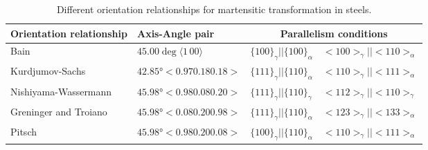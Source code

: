 
\begin{table*}
\begin{tabular}{ l l l l }
\hline\hline
    Orientation relationship & Axis-Angle pair & \multicolumn{2}{c}{Parallelism conditions} \\
    \hline
    Bain \cite{bain1924nature} &
    $45.00\deg\langle1\,00\rangle$ &
    $\{100\}_{\gamma}||\{100\}_{\alpha}$ & $<100>_{\gamma}||<110>_{\alpha}$ \\
    
    Kurdjumov-Sachs \cite{kurdjumow1930mechanismus} &
    $42.85°<0.97 0.18 0.18>$ &
    $\{111\}_{\gamma}||\{110\}_{\alpha}$ &
    $<110>_{\gamma}||<111>_{\alpha}$ \\
    
    Nishiyama-Wassermann \cite{nishiyama1934x,wassermann1935ueber} &
    $45.98° <0.98 0.08 0.20>$ &
    $\{111\}_{\gamma}||\{110\}_{\gamma}$ &
    $<112>_{\gamma}||<110>_{\gamma}$ \\
    
    Greninger and Troiano \cite{greninger1949mechanism} &
    $45.98° <0.08 0.20 0.98>$ &
    $\{111\}_{\gamma} || \{110\}_{\alpha}$ &
    $<123>_{\gamma} || <133>_{\alpha}$ \\
    
    Pitsch \cite{pitsch1962orientierungszusammenhang} &
    $45.98° <0.98 0.20 0.08>$ &
    $\{100\}_{\gamma} || \{110\}_{\alpha}$ &
    $<110>_{\gamma} || <111>_{\alpha}$ \\
\hline
\end{tabular}
\caption{\label{table_ORs}Different orientation relationships for martensitic transformation in steels.}
\end{table*}
